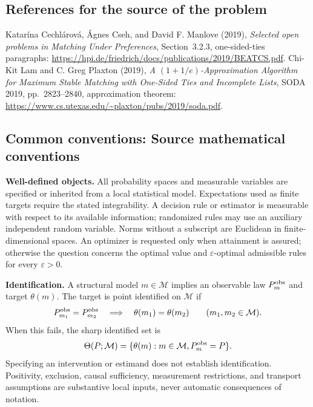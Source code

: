 \documentclass[11pt,a4paper]{article}
\begin{document}
\subsection*{References for the source of the problem}
Katar\'ina Cechl\'arov\'a, \'Agnes Cseh, and David F. Manlove (2019), \emph{Selected open problems in Matching Under Preferences}, Section~3.2.3, one-sided-ties paragraphs: \url{https://hpi.de/friedrich/docs/publications/2019/BEATCS.pdf}. Chi-Kit Lam and C. Greg Plaxton (2019), \emph{A $(1+1/e)$-Approximation Algorithm for Maximum Stable Matching with One-Sided Ties and Incomplete Lists}, SODA 2019, pp.~2823--2840, approximation theorem: \url{https://www.cs.utexas.edu/~plaxton/pubs/2019/soda.pdf}.

\subsection*{Common conventions: Source mathematical conventions}

\textbf{Well-defined objects.}
All probability spaces and measurable variables are specified or inherited
from a local statistical model. Expectations used as finite targets require
the stated integrability. A decision rule or estimator is measurable with
respect to its available information; randomized rules may use an auxiliary
independent random variable. Norms without a subscript are Euclidean in
finite-dimensional spaces. An optimizer is requested only when attainment
is assured; otherwise the question concerns the optimal value and
$\varepsilon$-optimal admissible rules for every $\varepsilon>0$.

\textbf{Identification.}
A structural model $m\in\mathcal M$ implies an observable law
$P_m^{\rm obs}$ and target $\theta(m)$. The target is point identified on
$\mathcal M$ if
\[
 P_{m_1}^{\rm obs}=P_{m_2}^{\rm obs}
 \quad\Longrightarrow\quad\theta(m_1)=\theta(m_2)
 \qquad(m_1,m_2\in\mathcal M).
\]
When this fails, the sharp identified set is
\[
 \Theta(P;\mathcal M)=\{\theta(m):m\in\mathcal M,
                                  P_m^{\rm obs}=P\}.
\]
Specifying an intervention or estimand does not establish identification.
Positivity, exclusion, causal sufficiency, measurement restrictions, and
transport assumptions are substantive local inputs, never automatic
consequences of notation.
\end{document}
